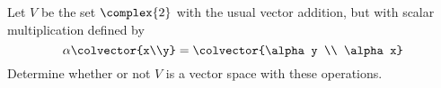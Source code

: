 %
Let $V$ be the set $\complex{2}$ with the usual vector addition, but with scalar multiplication defined by 
\begin{equation*}
\alpha \colvector{x\\y} = \colvector{\alpha y \\ \alpha x}
\end{equation*}
Determine whether or not $V$ is a vector space with these operations. 